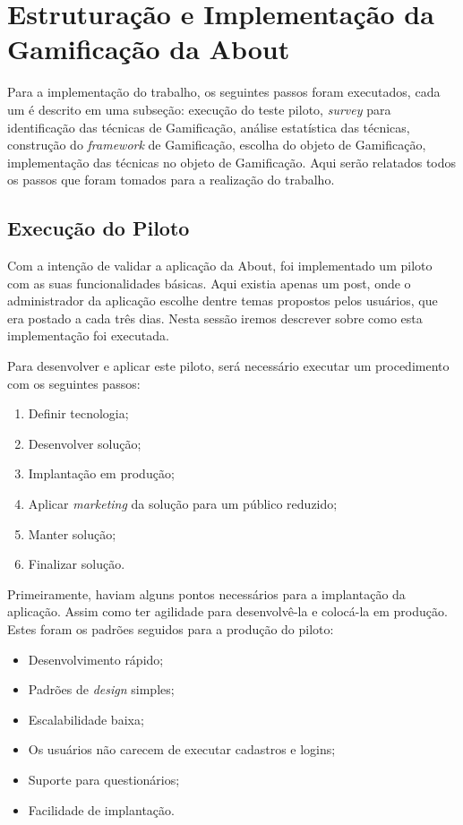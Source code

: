 \chapter[Estruturação e Implementação da Gamificação da About]{Estruturação e Implementação da Gamificação da About}
Para a implementação do trabalho, os seguintes
passos foram executados, cada um é
descrito em uma subseção: execução do teste piloto, \textit{survey} para identificação das técnicas de Gamificação,
análise estatística das técnicas, construção do \textit{framework} de Gamificação, escolha do objeto de Gamificação,
implementação das técnicas no objeto de Gamificação.
Aqui serão relatados todos os passos que foram tomados para a realização do trabalho.

\section{Execução do Piloto}
\label{sec:execucao_do_piloto}
Com a intenção de validar a aplicação da About, foi implementado um piloto com as suas funcionalidades
básicas. Aqui existia apenas um post, onde o administrador da aplicação escolhe dentre temas propostos
pelos usuários, que era postado a cada três dias.
Nesta sessão iremos descrever sobre como esta implementação foi executada.

Para desenvolver e aplicar este piloto, será necessário executar um procedimento
com os seguintes passos:

\begin{enumerate}
    \item Definir tecnologia;
    \item Desenvolver solução;
    \item Implantação em produção;
    \item Aplicar \textit{marketing} da solução para um público reduzido;
    \item Manter solução;
    \item Finalizar solução.
\end{enumerate}


Primeiramente, haviam alguns pontos necessários para a implantação da aplicação. 
Assim como ter agilidade para desenvolvê-la e colocá-la em produção.
Estes foram os padrões seguidos para a produção do piloto:


\begin{itemize}
    \item Desenvolvimento rápido;
    \item Padrões de \textit{design} simples;
    \item Escalabilidade baixa;
    \item Os usuários não carecem de executar cadastros e logins;
    \item Suporte para questionários;
    \item Facilidade de implantação.
\end{itemize}

